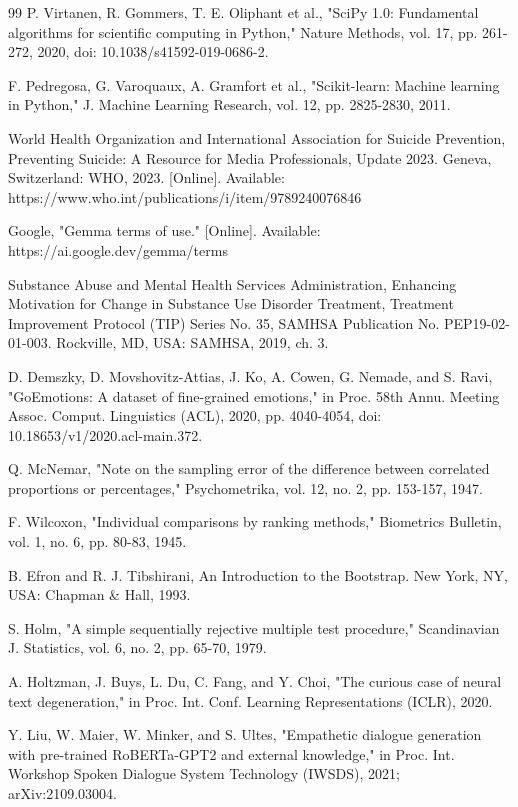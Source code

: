 \begin{thebibliography}{99}
P. Virtanen, R. Gommers, T. E. Oliphant et al., "SciPy 1.0: Fundamental algorithms for scientific computing in Python," Nature Methods, vol. 17, pp. 261-272, 2020, doi: 10.1038/s41592-019-0686-2.

F. Pedregosa, G. Varoquaux, A. Gramfort et al., "Scikit-learn: Machine learning in Python," J. Machine Learning Research, vol. 12, pp. 2825-2830, 2011.

World Health Organization and International Association for Suicide Prevention, Preventing Suicide: A Resource for Media Professionals, Update 2023. Geneva, Switzerland: WHO, 2023. [Online]. Available: https://www.who.int/publications/i/item/9789240076846

Google, "Gemma terms of use." [Online]. Available: https://ai.google.dev/gemma/terms

Substance Abuse and Mental Health Services Administration, Enhancing Motivation for Change in Substance Use Disorder Treatment, Treatment Improvement Protocol (TIP) Series No. 35, SAMHSA Publication No. PEP19-02-01-003. Rockville, MD, USA: SAMHSA, 2019, ch. 3.

D. Demszky, D. Movshovitz-Attias, J. Ko, A. Cowen, G. Nemade, and S. Ravi, "GoEmotions: A dataset of fine-grained emotions," in Proc. 58th Annu. Meeting Assoc. Comput. Linguistics (ACL), 2020, pp. 4040-4054, doi: 10.18653/v1/2020.acl-main.372.

Q. McNemar, "Note on the sampling error of the difference between correlated proportions or percentages," Psychometrika, vol. 12, no. 2, pp. 153-157, 1947.

F. Wilcoxon, "Individual comparisons by ranking methods," Biometrics Bulletin, vol. 1, no. 6, pp. 80-83, 1945.

B. Efron and R. J. Tibshirani, An Introduction to the Bootstrap. New York, NY, USA: Chapman \& Hall, 1993.

S. Holm, "A simple sequentially rejective multiple test procedure," Scandinavian J. Statistics, vol. 6, no. 2, pp. 65-70, 1979.

A. Holtzman, J. Buys, L. Du, C. Fang, and Y. Choi, "The curious case of neural text degeneration," in Proc. Int. Conf. Learning Representations (ICLR), 2020.

Y. Liu, W. Maier, W. Minker, and S. Ultes, "Empathetic dialogue generation with pre-trained RoBERTa-GPT2 and external knowledge," in Proc. Int. Workshop Spoken Dialogue System Technology (IWSDS), 2021; arXiv:2109.03004.


\end{thebibliography}
